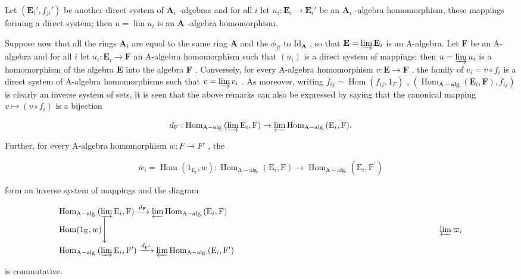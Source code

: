 Let \((\mathbf{E}_i', f_{ji}')\) be another direct system of \(\mathbf{A}_i\) -algebras and for all \(i\) let \(u_i: \mathbf{E}_i \to \mathbf{E}_i'\) be an \(\mathbf{A}_i\) -algebra homomorphism, these mappings forming a direct system; then \(u = \lim u_i\) is an \(\mathbf{A}\) -algebra homomorphism.

Suppose now that all the rings \(\mathbf{A}_i\) are equal to the same ring \(\mathbf{A}\) and the \(\phi_{ji}\) to \(\mathrm{Id}_{\mathbf{A}}\) , so that \(\mathbf{E} = \varinjlim \mathbf{E}_i\) is an A-algebra. Let \(\mathbf{F}\) be an A-algebra and for all \(i\) let \(u_i: \mathbf{E}_i \to \mathbf{F}\) an A-algebra homomorphism such that \((u_i)\) is a direct system of mappings; then \(u = \varinjlim u_i\) is a homomorphism of the algebra \(\mathbf{E}\) into the algebra \(\mathbf{F}\) . Conversely, for every A-algebra homomorphism \(v: \mathbf{E} \to \mathbf{F}\) , the family of \(v_i = v \circ f_i\) is a direct system of A-algebra homomorphisms such that \(v = \varinjlim v_i\) . As moreover, writing \(\bar{f}_{ij} = \operatorname{Hom}(f_{ij}, 1_F)\) , \((\operatorname{Hom}_{\mathbf{A-alg}}(\mathbf{E}_i, \mathbf{F}), \bar{f}_{ij})\) is clearly an inverse system of sets, it is seen that the above remarks can also be expressed by saying that the canonical mapping \(v \mapsto (v \circ f_i)\) is a bijection

\[
d _ {\mathrm{F}}: \operatorname{Hom} _ {\mathrm{A-alg.}} (\varinjlim \mathrm{E} _ {i}, \mathrm{F}) \rightarrow \varprojlim \operatorname{Hom} _ {\mathrm{A-alg.}} (\mathrm{E} _ {i}, \mathrm{F}).
\]

Further, for every A-algebra homomorphism \(w: F \rightarrow F'\) , the

\[
\bar {w} _ {i} = \operatorname{Hom} (1 _ {\mathrm{E} _ {i}}, w): \operatorname{Hom} _ {\mathrm{A-alg.}} (\mathrm{E} _ {i}, \mathrm{F}) \rightarrow \operatorname{Hom} _ {\mathrm{A-alg.}} (\mathrm{E} _ {i}, \mathrm{F} ^ {\prime})
\]

form an inverse system of mappings and the diagram

\[
\begin{array}{l} \operatorname{Hom} _ {\mathrm{A-alg.}} (\varinjlim \mathrm{E} _ {i}, \mathrm{F}) \xrightarrow {d _ {\mathrm{F}}} \varprojlim \operatorname{Hom} _ {\mathrm{A-alg.}} (\mathrm{E} _ {i}, \mathrm{F}) \\ \operatorname{Hom} (1 _ {\mathrm{E}}, w) \Biggl \downarrow \qquad \qquad \qquad \qquad \qquad \qquad \qquad \qquad \qquad \qquad \qquad \qquad \qquad \qquad \qquad \qquad \qquad \qquad \qquad \qquad \varprojlim \varpi_ {i} \\ \operatorname{Hom} _ {\mathrm{A-alg.}} (\varinjlim \mathrm{E} _ {i}, \mathrm{F} ^ {\prime}) \xrightarrow {d _ {\mathrm{F} ^ {\prime}}} \varprojlim \operatorname{Hom} _ {\mathrm{A-alg.}} (\mathrm{E} _ {i}, \mathrm{F} ^ {\prime}) \end{array}
\]

is commutative.

